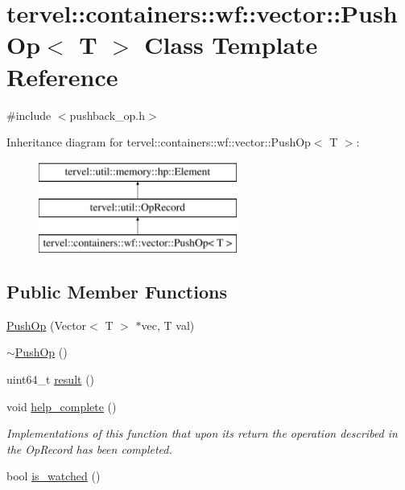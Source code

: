 \hypertarget{classtervel_1_1containers_1_1wf_1_1vector_1_1_push_op}{}\section{tervel\+:\+:containers\+:\+:wf\+:\+:vector\+:\+:Push\+Op$<$ T $>$ Class Template Reference}
\label{classtervel_1_1containers_1_1wf_1_1vector_1_1_push_op}


{\ttfamily \#include $<$pushback\+\_\+op.\+h$>$}

Inheritance diagram for tervel\+:\+:containers\+:\+:wf\+:\+:vector\+:\+:Push\+Op$<$ T $>$\+:\begin{figure}[H]
\begin{center}
\leavevmode
\includegraphics[height=3.000000cm]{classtervel_1_1containers_1_1wf_1_1vector_1_1_push_op}
\end{center}
\end{figure}
\subsection*{Public Member Functions}
\begin{DoxyCompactItemize}
\item 
\hyperlink{classtervel_1_1containers_1_1wf_1_1vector_1_1_push_op_a34175390fd8b79ed7f0cf9e00c0aacd6}{Push\+Op} (Vector$<$ T $>$ $\ast$vec, T val)
\item 
\hyperlink{classtervel_1_1containers_1_1wf_1_1vector_1_1_push_op_a9f4cfedad3558646b4ac15af5135b8ca}{$\sim$\+Push\+Op} ()
\item 
uint64\+\_\+t \hyperlink{classtervel_1_1containers_1_1wf_1_1vector_1_1_push_op_a6f55541df2382c5a269a5d88d8980952}{result} ()
\item 
void \hyperlink{classtervel_1_1containers_1_1wf_1_1vector_1_1_push_op_aca23a90c8ef1a6ac95a102def3b63d56}{help\+\_\+complete} ()
\begin{DoxyCompactList}\small\item\em Implementations of this function that upon its return the operation described in the Op\+Record has been completed. \end{DoxyCompactList}\item 
bool \hyperlink{classtervel_1_1containers_1_1wf_1_1vector_1_1_push_op_a3f3e9e0b7f1ea3c99ef17bb4dc8efc94}{is\+\_\+watched} ()
\end{DoxyCompactItemize}
